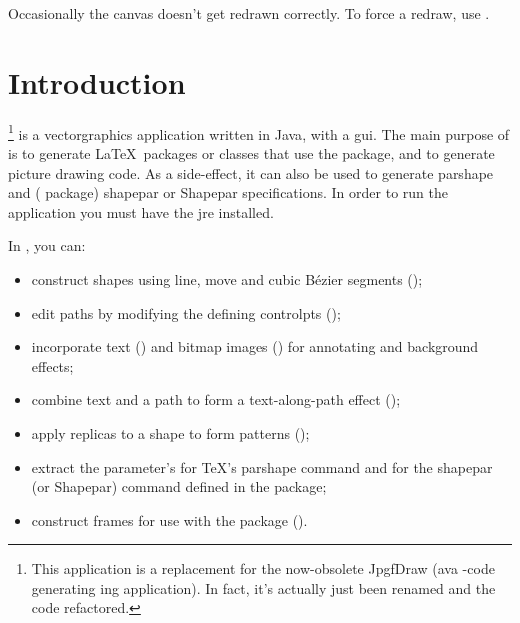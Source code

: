 Occasionally the canvas doesn't get redrawn correctly. To force a
redraw, use .


\mainmatter
\chapter{Introduction}
\label{sec:introduction}

\appname\footnote{This application is a replacement for the now-obsolete
   JpgfDraw (ava -code generating ing application).
   In fact, it's actually just been renamed and the code refactored.}
   is a \gls{vectorgraphics} application written in \gls{Java}, with a 
   \gls{gui}.  The main purpose of \appname is to generate \LaTeX\ packages or 
   classes that use the  package, and to generate
    picture drawing code. As a side-effect, it can also be
   used to generate \gls{parshape} and ( package) \gls{shapepar} or 
   \gls{Shapepar} specifications. In order to run the application you 
   must have the \gls{jre} installed.
   
   
   In \appname, you can:
   
   \begin{itemize}
    \item construct shapes using line, move and cubic Bézier segments
();

    \item edit paths by modifying the defining \glspl{controlpt}
    ();

    \item incorporate text () and 
    bitmap images ()
    for annotating and background effects;

    \item combine text and a path to form a text-along-path
    effect ();

    \item apply replicas to a shape to form patterns
    ();

    \item extract the parameter's for \TeX's \gls{parshape} command and for 
    the \gls{shapepar} (or \gls{Shapepar}) command defined in the
     package;

    \item construct frames for use with the  package
    ().
   \end{itemize}
   
